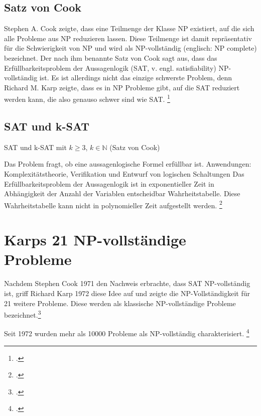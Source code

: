 \documentclass{lehramt-informatik-haupt}
\begin{document}
%

\subsection{Satz von Cook}

Stephen A. Cook zeigte, dass eine Teilmenge der Klasse NP existiert, auf
die sich alle Probleme aus NP reduzieren lassen. Diese Teilmenge ist
damit repräsentativ für die Schwierigkeit von NP und wird als
NP-vollständig (englisch: NP complete) bezeichnet. Der nach ihm benannte
Satz von Cook sagt aus, dass das Erfüllbarkeitsproblem der Aussagenlogik
(SAT, v. engl. satisfiability) NP-vollständig ist. Es ist allerdings
nicht das einzige schwerste Problem, denn Richard M. Karp zeigte, dass
es in NP Probleme gibt, auf die SAT reduziert werden kann, die also
genauso schwer sind wie SAT.
\footcite[Seite 70]{theo:fs:4}

\subsection{SAT und k-SAT}

SAT und k-SAT mit $k \geq 3$, $k \in \mathbb{N}$ (Satz von Cook)

Das Problem fragt, ob eine aussagenlogische Formel erfüllbar ist.
Anwendungen: Komplexitätstheorie, Verifikation und Entwurf von logischen
Schaltungen Das Erfüllbarkeitsproblem der Aussagenlogik ist in
exponentieller Zeit in Abhängigkeit der Anzahl der Variablen
entscheidbar Wahrheitstabelle. Diese Wahrheitstabelle kann nicht in
polynomieller Zeit aufgestellt werden.
\footcite[Seite 71]{theo:fs:4}

\section{Karps 21 NP-vollständige Probleme}

Nachdem Stephen Cook 1971 den Nachweis erbrachte, dass SAT
NP-vollständig ist, griff Richard Karp 1972 diese Idee auf und zeigte
die NP-Vollständigkeit für 21 weitere Probleme. Diese werden als
klassische NP-vollständige Probleme bezeichnet.\footcite{wiki:karps-21}

Seit 1972 wurden mehr als 10000 Probleme als NP-vollständig
charakterisiert.
\footcite[Seite 80]{theo:fs:4}

%
\end{document}
